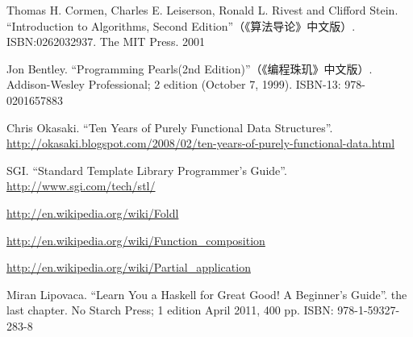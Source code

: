 \documentclass[b5paper]{ctexart}
\begin{document}


\ifx\wholebook\relax \else
\begin{thebibliography}{99}

Thomas H. Cormen, Charles E. Leiserson, Ronald L. Rivest and Clifford Stein.
``Introduction to Algorithms, Second Edition''（《算法导论》中文版）. ISBN:0262032937. The MIT Press. 2001

Jon Bentley. ``Programming Pearls(2nd Edition)''（《编程珠玑》中文版）. Addison-Wesley Professional; 2 edition (October 7, 1999). ISBN-13: 978-0201657883

Chris Okasaki. ``Ten Years of Purely Functional Data Structures''. \url{http://okasaki.blogspot.com/2008/02/ten-years-of-purely-functional-data.html}

SGI. ``Standard Template Library Programmer's Guide''. \url{http://www.sgi.com/tech/stl/}

\url{http://en.wikipedia.org/wiki/Foldl}

\url{http://en.wikipedia.org/wiki/Function_composition}

\url{http://en.wikipedia.org/wiki/Partial_application}

Miran Lipovaca. ``Learn You a Haskell for Great Good! A Beginner's Guide''. the last chapter. No Starch Press; 1 edition April 2011, 400 pp. ISBN: 978-1-59327-283-8

\end{thebibliography}

\expandafter\enddocument
\fi
\end{document}
